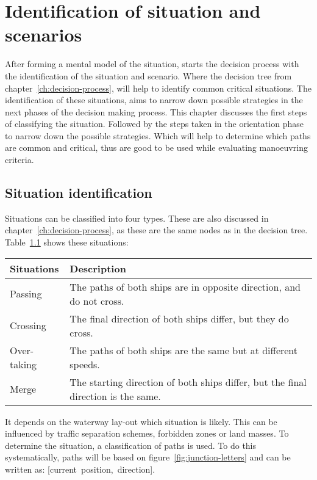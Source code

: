 \chapter{Identification of situation and scenarios}
\label{ch:identify-situation}
After forming a mental model of the situation, starts the decision process with the identification of the situation and scenario. Where the decision tree from chapter~\ref{ch:decision-process}, will help to identify common critical situations. The identification of these situations, aims to narrow down possible strategies in the next phases of the decision making process. This chapter discusses the first steps of classifying the situation. Followed by the steps taken in the orientation phase to narrow down the possible strategies. Which will help to determine which paths are common and critical, thus are good to be used while evaluating manoeuvring criteria.

\section{Situation identification}
\label{sec:situation-identification}
Situations can be classified into four types. These are also discussed in chapter~\ref{ch:decision-process}, as these are the same nodes as in the decision tree. Table~\ref{tab:situations2} shows these situations:
\begin{table}[H]
	\centering
	\begin{tabular}{p{}|p{}}
		\toprule
		Situations & Description\\
		\midrule
		Passing & The paths of both ships are in opposite direction, and do not cross. \\
		Crossing & The final direction of both ships differ, but they do cross. \\
		Over-taking & The paths of both ships are the same but at different speeds. \\
		Merge & The starting direction of both ships differ, but the final direction is the same. \\
		\bottomrule
	\end{tabular}
	
	\label{tab:situations2}
\end{table}
It depends on the waterway lay-out which situation is likely. This can be influenced by traffic separation schemes, forbidden zones or land masses. To determine the situation, a classification of paths is used. To do this systematically, paths will be based on figure~\ref{fig:junction-letters} and can be written as: [current~position,~direction].

